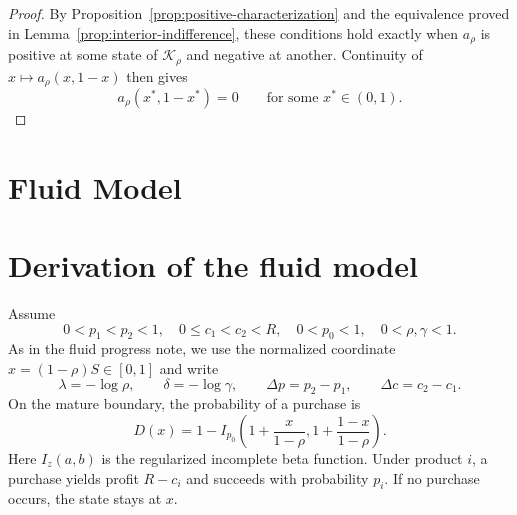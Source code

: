 \documentclass[11pt]{article}
\begin{document}
\begin{proof}
By Proposition~\ref{prop:positive-characterization} and the
equivalence proved in Lemma~\ref{prop:interior-indifference},
these conditions hold exactly when $a_\rho$ is positive at some
state of $\mathcal K_\rho$ and negative at another.
Continuity of $x\mapsto a_\rho(x,1-x)$ then gives
\begin{equation}
a_\rho(x^*,1-x^*)=0
\qquad\text{for some }x^*\in(0,1).
\end{equation}
\end{proof}
\section{Fluid Model}

\section*{Derivation of the fluid model}
Assume
\begin{equation*}
0<p_1<p_2<1,\quad 0\le c_1<c_2<R,\quad
0<p_0<1,\quad 0<\rho,\gamma<1.
\end{equation*}
As in the fluid progress note, we use the normalized coordinate
$x=(1-\rho)S\in[0,1]$ and write
\begin{equation*}
\lambda=-\log\rho,\qquad \delta=-\log\gamma,\qquad
\Delta p=p_2-p_1,\qquad \Delta c=c_2-c_1.
\end{equation*}
On the mature boundary, the probability of a purchase is
\begin{equation*}
D(x)=1-I_{p_0}\!\left(1+\frac{x}{1-\rho},
                         1+\frac{1-x}{1-\rho}\right).
\end{equation*}
Here $I_z(a,b)$ is the regularized incomplete beta function. Under
product $i$, a purchase yields profit $R-c_i$ and succeeds with probability
$p_i$. If no purchase occurs, the state stays at $x$.
\end{document}
